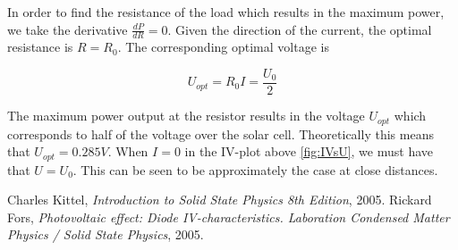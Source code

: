\documentclass[a4paper,twoside=false,abstract=false,numbers=noenddot,
titlepage=false,headings=small,parskip=half,version=last]{scrartcl}
\begin{document}
In order to find the resistance of the load which results in the maximum power, we take the derivative $\frac{dP}{dR} = 0$.
Given the direction of the current, the optimal resistance is $R = R_0$. The corresponding optimal voltage is

\begin{equation}
    U_{opt}=R_0 I=\frac{U_0}{2}
\end{equation}

The maximum power output at the resistor results in the voltage $ U_{opt}$
which corresponds to half of the voltage over the solar cell. Theoretically
this means that $U_{opt} = 0.285 V$. When $I=0$ in the IV-plot above \ref{fig:IVsU}, we must have that $U = U_0$. This can be seen to be approximately the case at close distances.

\begin{thebibliography}{1}
        Charles Kittel,
        {\em Introduction to Solid State Physics 8th Edition},
        2005.
		Rickard Fors,
		{\em Photovoltaic effect: Diode IV-characteristics. Laboration Condensed Matter Physics / Solid State Physics},
		2005.
\end{thebibliography}
\end{document}

